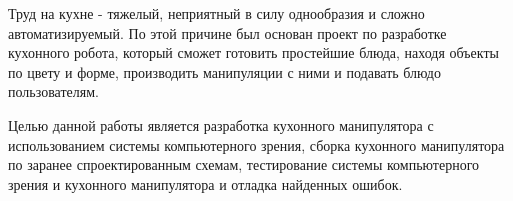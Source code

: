 Труд на кухне - тяжелый, неприятный в силу однообразия и сложно автоматизируемый. По этой причине был основан проект по разработке кухонного робота, который сможет готовить простейшие блюда, находя объекты по цвету и форме, производить манипуляции с ними и подавать блюдо пользователям.

Целью данной работы является разработка кухонного манипулятора с использованием системы компьютерного зрения, сборка кухонного манипулятора по заранее спроектированным схемам, тестирование системы компьютерного зрения и кухонного манипулятора и отладка найденных ошибок.